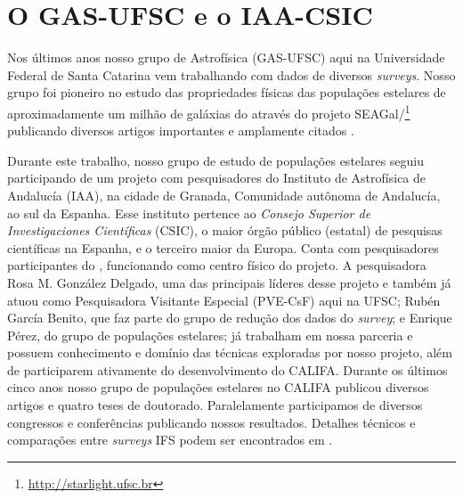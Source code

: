 \section{O GAS-UFSC e o IAA-CSIC}
\label{sec:intro:UFSCeIAA}

Nos últimos anos nosso grupo de Astrofísica (GAS-UFSC) aqui na Universidade Federal de Santa Catarina vem trabalhando com dados de diversos {\em surveys}. Nosso grupo foi pioneiro no estudo das propriedades físicas das populações estelares de aproximadamente um milhão de galáxias do \SDSS através do projeto SEAGal/\starlight\footnote{\href{http://starlight.ufsc.br}{http://starlight.ufsc.br}} publicando diversos artigos importantes e amplamente citados \citep[e.g., ][]{CidFernandes.etal.2005a, Mateus.etal.2006a, Stasinska.etal.2006a, Asari.etal.2007a, Stasinska.etal.2008a, CidFernandes.etal.2011a}.

Durante este trabalho, nosso grupo de estudo de populações estelares seguiu participando de um projeto com pesquisadores do Instituto de Astrofísica de Andalucía (IAA), na cidade de Granada, Comunidade autônoma de Andalucía, ao sul da Espanha. Esse instituto pertence ao {\em Consejo Superior de Investigaciones Científicas} (CSIC), o maior órgão público (estatal) de pesquisas científicas na Espanha, e o terceiro maior da Europa. Conta com pesquisadores participantes do \CALS, funcionando como centro físico do projeto.
A pesquisadora Rosa M. González Delgado, uma das principais líderes desse projeto e também já atuou como Pesquisadora Visitante Especial (PVE-CsF) aqui na UFSC;
Rubén García Benito, que faz parte do grupo de redução dos dados do {\em survey}; e Enrique Pérez, do grupo de populações estelares; já trabalham em nossa parceria e possuem conhecimento e domínio das técnicas exploradas por nosso projeto, além de participarem ativamente do desenvolvimento do CALIFA. Durante os últimos cinco anos nosso grupo de populações estelares no CALIFA publicou diversos artigos e quatro teses de doutorado. Paralelamente participamos de diversos congressos e conferências publicando nossos resultados. Detalhes técnicos e comparações entre {\em surveys} IFS podem ser encontrados em \citet{Andre2015}.

